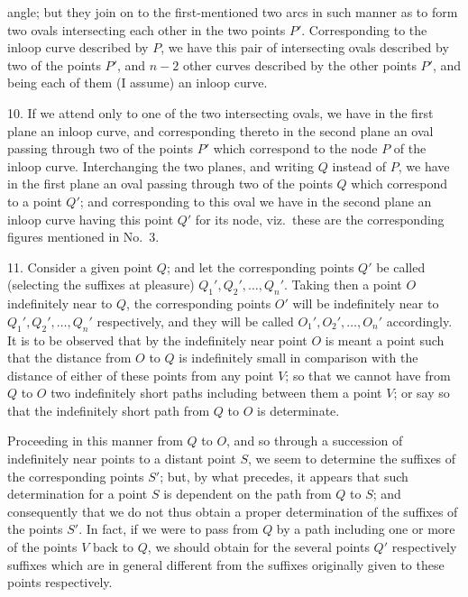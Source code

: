 \documentclass[11pt,a4paper]{article}
\begin{document}
\newpage


\noindent angle; but they join on to the first-mentioned two arcs in such manner as to form two ovals intersecting each other in the two points $P'$. Corresponding to the inloop curve described by $P$, we have this pair of intersecting ovals described by two of the points $P'$, and $n - 2$ other curves described by the other points $P'$, and being each of them (I assume) an inloop curve.

\medskip

10. If we attend only to one of the two intersecting ovals, we have in the first plane an inloop curve, and corresponding thereto in the second plane an oval passing through two of the points $P'$ which correspond to the node $P$ of the inloop curve. Interchanging the two planes, and writing $Q$ instead of $P$, we have in the first plane an oval passing through two of the points $Q$ which correspond to a point $Q'$; and corresponding to this oval we have in the second plane an inloop curve having this point $Q'$ for its node, viz.\ these are the corresponding figures mentioned in No.~3.

\medskip

11. Consider a given point $Q$; and let the corresponding points $Q'$ be called (selecting the suffixes at pleasure) $Q_{1}', Q_{2}', \ldots, Q_{n}'$. Taking then a point $O$ indefinitely near to $Q$, the corresponding points $O'$ will be indefinitely near to $Q_{1}', Q_{2}', \ldots, Q_{n}'$ respectively, and they will be called $O_{1}', O_{2}', \ldots, O_{n}'$ accordingly. It is to be observed that by the indefinitely near point $O$ is meant a point such that the distance from $O$ to $Q$ is indefinitely small in comparison with the distance of either of these points from any point $V$; so that we cannot have from $Q$ to $O$ two indefinitely short paths including between them a point $V$; or say so that the indefinitely short path from $Q$ to $O$ is determinate.

\medskip

Proceeding in this manner from $Q$ to $O$, and so through a succession of indefinitely near points to a distant point $S$, we seem to determine the suffixes of the corresponding points $S'$; but, by what precedes, it appears that such determination for a point $S$ is dependent on the path from $Q$ to $S$; and consequently that we do not thus obtain a proper determination of the suffixes of the points $S'$. In fact, if we were to pass from $Q$ by a path including one or more of the points $V$ back to $Q$, we should obtain for the several points $Q'$ respectively suffixes which are in general different from the suffixes originally given to these points respectively.
\end{document}
